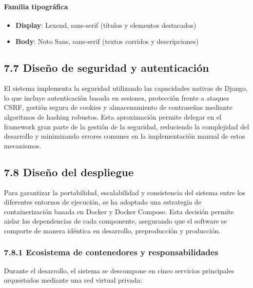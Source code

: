 \paragraph*{Familia tipográfica}
 
\begin{itemize}
\item \textbf{Display}: Lexend, sans-serif (títulos y elementos destacados)
\item \textbf{Body}: Noto Sans, sans-serif (textos corridos y descripciones)
\end{itemize}
 
\subsection{7.7 Diseño de seguridad y autenticación}
El sistema implementa la seguridad utilizando las capacidades nativas de Django,
lo que incluye autenticación basada en sesiones, protección frente a ataques
CSRF, gestión segura de cookies y almacenamiento de contraseñas mediante
algoritmos de hashing robustos. Esta aproximación permite delegar en el
framework gran parte de la gestión de la seguridad, reduciendo la complejidad
del desarrollo y minimizando errores comunes en la implementación manual de
estos mecanismos.
 
\subsection{7.8 Diseño del despliegue}
Para garantizar la portabilidad, escalabilidad y consistencia del sistema entre
los diferentes entornos de ejecución, se ha adoptado una estrategia de
containerización basada en Docker y Docker Compose. Esta decisión permite aislar
las dependencias de cada componente, asegurando que el software se comporte de
manera idéntica en desarrollo, preproducción y producción.
 
\subsubsection{7.8.1 Ecosistema de contenedores y responsabilidades}
 
Durante el desarrollo, el sistema se descompone en cinco servicios principales orquestados mediante una
red virtual privada:
 
